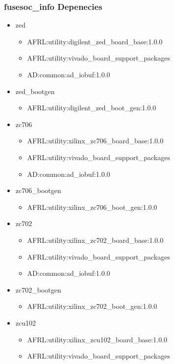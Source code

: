 \subsubsection{fusesoc\_info Depenecies}
\begin{itemize}
\item zed
	\begin{itemize}
	\item AFRL:utility:digilent\_zed\_board\_base:1.0.0
	\item AFRL:utility:vivado\_board\_support\_packages
	\item AD:common:ad\_iobuf:1.0.0
	\end{itemize}
\item zed\_bootgen
	\begin{itemize}
	\item AFRL:utility:digilent\_zed\_boot\_gen:1.0.0
	\end{itemize}
\item zc706
	\begin{itemize}
	\item AFRL:utility:xilinx\_zc706\_board\_base:1.0.0
	\item AFRL:utility:vivado\_board\_support\_packages
	\item AD:common:ad\_iobuf:1.0.0
	\end{itemize}
\item zc706\_bootgen
	\begin{itemize}
	\item AFRL:utility:xilinx\_zc706\_boot\_gen:1.0.0
	\end{itemize}
\item zc702
	\begin{itemize}
	\item AFRL:utility:xilinx\_zc702\_board\_base:1.0.0
	\item AFRL:utility:vivado\_board\_support\_packages
	\item AD:common:ad\_iobuf:1.0.0
	\end{itemize}
\item zc702\_bootgen
	\begin{itemize}
	\item AFRL:utility:xilinx\_zc702\_boot\_gen:1.0.0
	\end{itemize}
\item zcu102
	\begin{itemize}
	\item AFRL:utility:xilinx\_zcu102\_board\_base:1.0.0
	\item AFRL:utility:vivado\_board\_support\_packages

\end{itemize}
\end{itemize}
